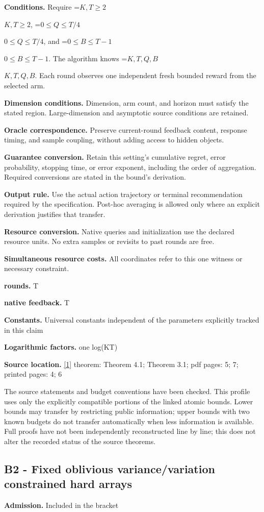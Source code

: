 \documentclass[10pt,a4paper]{article}
\newcommand{\AtlasMath}[1]{\par\begingroup\centering\setbox0=\hbox{$\displaystyle #1$}\ifdim\wd0>1.4\linewidth\typeout{ATLAS WIDE FORMULA: \the\wd0}\fi\ifdim\wd0>\linewidth\resizebox{\linewidth}{!}{\box0}\else\box0\fi\par\endgroup}
\newcommand{\AtlasInlineMath}[1]{\begingroup\setbox0=\hbox{$#1$}\ifdim\wd0>.4\linewidth\endgroup\AtlasMath{#1}\else\endgroup$#1$\fi}
\begin{document}
\textbf{Conditions.} Require \AtlasInlineMath{K,T\ge2}, \AtlasInlineMath{0\le Q\le T/4}, and \AtlasInlineMath{0\le B\le T-1}. The algorithm knows \AtlasInlineMath{K,T,Q,B}. Each round observes one independent fresh bounded reward from the selected arm.

\textbf{Dimension conditions.} Dimension, arm count, and horizon must satisfy the stated region. Large-dimension and asymptotic source conditions are retained.

\textbf{Oracle correspondence.} Preserve current-round feedback content, response timing, and sample coupling, without adding access to hidden objects.

\textbf{Guarantee conversion.} Retain this setting's cumulative regret, error probability, stopping time, or error exponent, including the order of aggregation. Required conversions are stated in the bound's derivation.

\textbf{Output rule.} Use the actual action trajectory or terminal recommendation required by the specification. Post-hoc averaging is allowed only where an explicit derivation justifies that transfer.

\textbf{Resource conversion.} Native queries and initialization use the declared resource units. No extra samples or revisits to past rounds are free.

\textbf{Simultaneous resource costs.} All coordinates refer to this one witness or necessary constraint.

\textbf{rounds.} T

\textbf{native feedback.} T

\textbf{Constants.} Universal constants independent of the parameters explicitly tracked in this claim

\textbf{Logarithmic factors.} one log(KT)

\textbf{Source location.} \href{https://arxiv.org/pdf/2610.26116}{[1]} theorem: Theorem 4.1; Theorem 3.1; pdf pages: 5; 7; printed pages: 4; 6

The source statements and budget conventions have been checked. This profile uses only the explicitly compatible portions of the linked atomic bounds. Lower bounds may transfer by restricting public information; upper bounds with two known budgets do not transfer automatically when less information is available. Full proofs have not been independently reconstructed line by line; this does not alter the recorded status of the source theorems.

\subsection{B2 - Fixed oblivious variance/variation constrained hard arrays}
\textbf{Admission.} Included in the bracket
\end{document}
